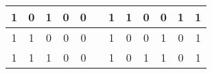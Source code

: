 \documentclass[12pt,a4]{article}
\begin{document}
\begin{enumerate}
\begin{enumerate}
\begin{figure}[H]
\begin{tabular} {|c|c|c|c|c||c||c|c|c|c|c|c|}
            \hline                                                                                                                         
            1 & 0 & 1 & 0 & 0 & & 1 &              1 &                  0 &                            0 &                                1 &                                1 \\
            \hline                                                                                                                         
            1 & 1 & 0 & 0 & 0 & & 1 &              0 &                  0 &                            1 &                                0 &                                1 \\
            \hline                                                                                                                         
            1 & 1 & 1 & 0 & 0 & & 1 &              0 &                  1 &                            1 &                                0 &                                1 \\
            \hline
            

\end{tabular}
\end{figure}
\end{enumerate}
\end{enumerate}
\end{document}
